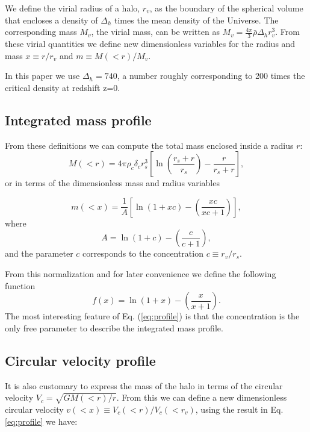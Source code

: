\documentclass[a4,useAMS,usenatbib,usegraphicx]{mn2e}
\begin{document}
We define the virial radius of a halo, $r_v$, as the boundary of the
spherical volume that encloses a density of $\Delta_h$ times the mean
density of the Universe.  
The corresponding mass $M_{v}$, the virial mass, can be written as
$M_{v} = \frac{4\pi}{3}\bar{\rho}\Delta_h r_v^3$.  
From these virial quantities we define new dimensionless variables for
the radius and mass $x\equiv r/r_v$ and $m\equiv M(<r)/M_v$. 

In this paper we use $\Delta_h=740$, a number roughly corresponding to
200 times the critical density at redshift z=0.


\subsection{Integrated mass profile}

From these definitions we can compute the total mass enclosed inside a
radius $r$: 
\begin{equation}
M(<r) = 4\pi\rho_c\delta_c  r_s^3\left[\ln \left
  (\frac{r_s+r}{r_s}\right) - \frac{r}{r_s+r}\right],
\end{equation}
%
or in terms of the dimensionless mass and radius variables

\begin{equation}
m(<x) =
\frac{1}{A}\left[\ln\left(1+xc\right)-\left(\frac{xc}{xc+1}\right)\right],
\label{eq:profile}
\end{equation}
%
where
%
\begin{equation}
A=\ln\left(1+c\right)-\left(\frac{c}{c+1}\right),
\end{equation}
%
and the parameter $c$ corresponds to the concentration $c\equiv r_v/r_s$.

From this normalization and for later convenience we define the
following function
%
\begin{equation}
f(x) = \ln\left(1+x\right)-\left(\frac{x}{x+1}\right).
\label{eq:f_NFW}
\end{equation}
%
The most interesting feature of Eq. (\ref{eq:profile}) is that the
concentration is the only free parameter to describe the integrated
mass profile.
 
\subsection{Circular velocity profile}

It is also customary to express the mass of the halo in terms of the
circular velocity $V_{c}=\sqrt{GM(<r)/r}$.
From this we can define a new dimensionless circular velocity $v(<x)\equiv
V_{c}(<r)/V_{c}(<r_v)$, using the result in Eq. \ref{eq:profile}
we have:
\end{document}
